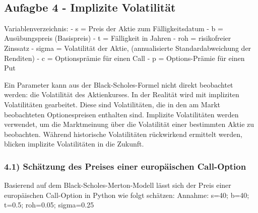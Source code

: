 \documentclass[paper=landscape]{scrartcl}
\begin{document}
    \begin{center}
    \end{center}
    { \hspace*{\fill} \\}
    
    \hypertarget{aufagbe-4---implizite-volatilituxe4t}{%
\subsection{Aufagbe 4 - Implizite
Volatilität}\label{aufagbe-4---implizite-volatilituxe4t}}

Variablenverzeichnis: - s = Preis der Aktie zum Fälligkeitsdatum - b =
Ausübungspreis (Basispreis) - t = Fälligkeit in Jahren - roh =
risikofreier Zinssatz - sigma = Volatilität der Aktie, (annualisierte
Standardabweichung der Renditen) - c = Optionsprämie für einen Call - p
= Options-Prämie für einen Put

Ein Parameter kann aus der Black-Scholes-Formel nicht direkt beobachtet
werden: die Volatilität des Aktienkurses. In der Realität wird mit
impliziten Volatilitäten gearbeitet. Diese sind Volatilitäten, die in
den am Markt beobachteten Optionespreisen enthalten sind. Implizite
Volatilitäten werden verwendet, um die Marktmeinung über die Volatilität
einer bestimmten Aktie zu beobachten. Während historische Volatilitäten
rückwirkend ermittelt werden, blicken implizite Volatilitäten in die
Zukunft.

\hypertarget{schuxe4tzung-des-preises-einer-europuxe4ischen-call-option}{%
\subsubsection{4.1) Schätzung des Preises einer europäischen
Call-Option}\label{schuxe4tzung-des-preises-einer-europuxe4ischen-call-option}}

Basierend auf dem Black-Scholes-Merton-Modell lässt sich der Preis einer
europäischen Call-Option in Python wie folgt schätzen: Annahme: s=40;
b=40; t=0.5; roh=0.05; sigma=0.25
\end{document}
